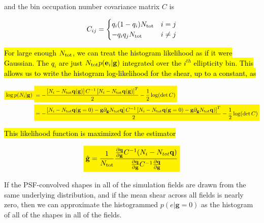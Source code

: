 \documentclass[iop]{emulateapj}
\newcommand{\mathcolorbox}[2]{\colorbox{#1}{$\displaystyle #2$}}
\begin{document}
and the bin occupation number covariance matrix $C$ is

\begin{equation}
C_{ij}= \begin{cases}
q_i ( 1 - q_i) N_{\rm tot} &  i=j\\
-q_i q_j N_{\rm tot} &  i \ne j
\end{cases}
\end{equation}

\hl{For large enough $N_{\rm tot}$, we can treat the histogram likelihood as
if it were Gaussian. The $q_i$ are just $N_{\rm tot} p(\mathbf{e}_i|\mathbf{g})$
integrated over the $i^{th}$ ellipticity bin. This allows us to
write the histogram log-likelihood for the shear, up to a constant, as}

\begin{widetext}
\begin{align}
\mathcolorbox{yellow}{  \log p(N_i | \mathbf{g} )} & \mathcolorbox{yellow}{= -\frac{\left[N_i - N_{\rm tot} \mathbf{q} (\mathbf{g})
                              \right]C^{-1} \left[N_i - N_{\rm tot} \mathbf{q}
                              (\mathbf{g}) \right]^T}{2} -
                              \frac{1}{2}\log(\det{}C)} \\ \nonumber
                            &\mathcolorbox{yellow}{ = -\frac{\left[N_i - N_{\rm tot} \mathbf{q} (\mathbf{g}=0) - \mathbf{g} \partial_\mathbf{g}
                              N_{\rm tot} \mathbf{q} \right]C^{-1} \left[N_i - N_{\rm tot} \mathbf{q} (\mathbf{g}=0) -
                              \mathbf{g} \partial_\mathbf{g} N_{\rm tot}
                              \mathbf{q}) \right]^T}{2} -\frac{1}{2}\log(\det{}C)}
\end{align}

\end{widetext}
\hl{This likelihood function is maximized for the estimator}

\begin{align}
  \mathcolorbox{yellow}{\hat{\mathbf{g}} = \frac{1}{N_{\rm tot}}\frac{\frac{\partial \mathbf{q}}{\partial {\mathbf{g}}} C^{-1} (N_i -  N_{tot }\mathbf{q})}{\frac{\partial \mathbf{q}}{\partial {\mathbf{g}}} C^{-1} \frac{\partial \mathbf{q}}{\partial {\mathbf{g}}}}}
\label{eqn:mle}
\end{align}


If the PSF-convolved shapes in all of the simulation fields are drawn
from the same underlying distribution, and if the mean shear across
all fields is nearly zero, then we can approximate the histogrammed
$p(e|\mathbf{g}=0)$ as the histogram of all of the shapes in all of the
fields.
\end{document}
